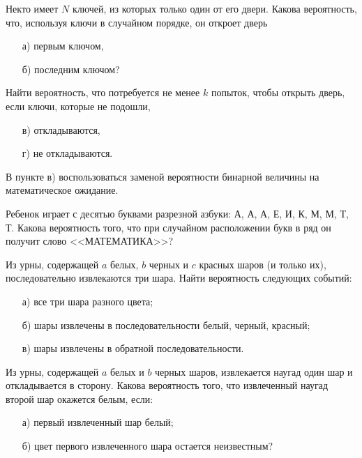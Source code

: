

\begin{problem}
Некто имеет $N$ ключей, из которых только один от его двери. Какова вероятность, что, используя ключи в случайном порядке, 
он откроет дверь 
\begin{enumerate}
\item[а)] первым ключом, 
\item[б)] последним ключом? 
\end{enumerate}
Найти вероятность, что потребуется не менее $k$ попыток, чтобы открыть дверь, если ключи, которые не подошли, 
\begin{enumerate}
\item[в)] откладываются, 
\item[г)] не откладываются. 
\end{enumerate}

\begin{ordre}
В пункте в) воспользоваться заменой вероятности бинарной величины на математическое ожидание.
\end{ordre}

\end{problem}


\begin{problem}
Ребенок играет с десятью буквами разрезной азбуки: А, А, А, Е, И, К, М, М, Т, Т. 
Какова вероятность того, что при случайном расположении букв в ряд он получит слово <<МАТЕМАТИКА>>? 
\end{problem}


\begin{problem}
Из урны, содержащей $a$ белых, $b$ черных и $c$ красных шаров (и только их), последовательно извлекаются три шара. Найти 
вероятность следующих событий: 
\begin{enumerate}
\item[а)] все три шара разного цвета; 
\item[б)] шары извлечены в последовательности белый, черный, красный; 
\item[в)] шары извлечены в обратной последовательности. 
\end{enumerate}
\end{problem}



\begin{problem}
Из урны, содержащей $a$ белых и $b$ черных шаров, извлекается наугад один шар и откладывается в сторону. Какова вероятность 
того, что извлеченный наугад второй шар окажется белым, если: 
\begin{enumerate}
\item[а)] первый извлеченный шар белый; 
\item[б)] цвет  первого извлеченного шара остается неизвестным? 
\end{enumerate}
\end{problem}




